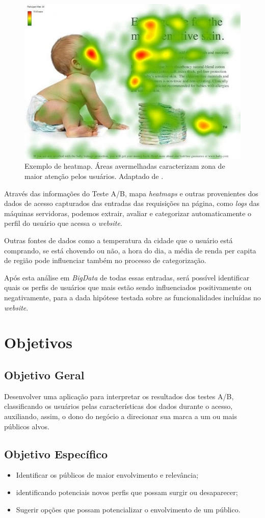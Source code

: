 \documentclass[12pt]{article}
\begin{document}
\begin{figure}[ht]
\centering
\includegraphics[width=.5\textwidth]{fig1.jpg}
\caption{Exemplo de heatmap. Áreas avermelhadas caracterizam zona de maior atenção pelos usuários. Adaptado de \cite{goward:13}.}
\label{fig:heatmap1}
\end{figure}

Através das informações do Teste A/B, mapa \textit{heatmaps} e outras provenientes dos dados de acesso capturados das entradas das requisições na página, como \textit{logs} das máquinas servidoras, podemos extrair, avaliar e categorizar automaticamente o perfil do usuário que acessa o \textit{website}.

Outras fontes de dados como a temperatura da cidade que o usuário está comprando, se está chovendo ou não, a hora do dia, a média de renda per capita de região pode influenciar também no processo de categorização.

Após esta análise em \textit{BigData} de todas essas entradas, será possível identificar quais os perfis de usuários que mais estão sendo influenciados positivamente ou negativamente, para a dada hipótese testada sobre as funcionalidades incluídas no \textit{website}.

\section{Objetivos}
\subsection{Objetivo Geral}
Desenvolver uma aplicação para interpretar os resultados dos testes A/B, classificando os usuários pelas características dos dados durante o acesso, auxiliando, assim, o dono do negócio a direcionar sua marca a um ou mais públicos alvos.

\subsection{Objetivo Específico}
\begin{itemize}
\item Identificar os públicos de maior envolvimento e relevância;
\item identificando potenciais novos perfis que possam surgir ou desaparecer;
\item Sugerir opções que possam potencializar o envolvimento de um público.
\end{itemize}
\end{document}
